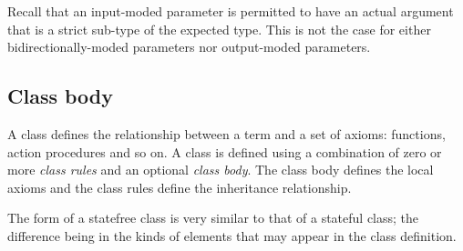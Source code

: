 Recall that an input-moded parameter is permitted to have an actual argument that is a strict sub-type of the expected type. This is not the case for either bidirectionally-moded parameters nor output-moded parameters.


\subsection{Class body}
\label{object:class body}

A class defines the relationship between a term and a set of axioms: functions, action procedures and so on. A class is defined using a combination of zero or more \emph{class rules} and an optional \emph{class body}. The class body defines the local axioms and the class rules define the inheritance relationship.

The form of a statefree class is very similar to that of a stateful class; the difference being in the kinds of elements that may appear in the class definition.

